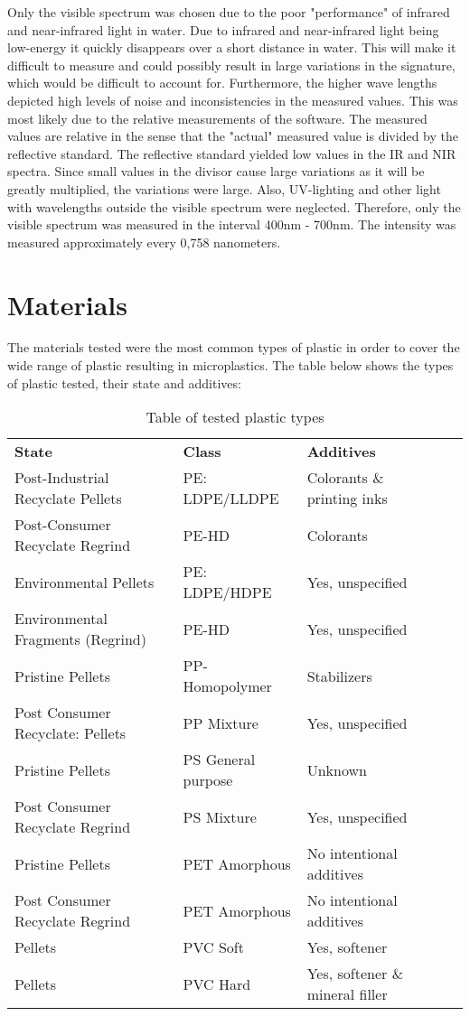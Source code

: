 Only the visible spectrum was chosen due to the poor "performance" of infrared and near-infrared light in water. Due to infrared and near-infrared light being low-energy it quickly disappears over a short distance in water. This will make it difficult to measure and could possibly result in large variations in the signature, which would be difficult to account for. Furthermore, the higher wave lengths depicted high levels of noise and inconsistencies in the measured values. This was most likely due to the relative measurements of the software. The measured values are relative in the sense that the "actual" measured value is divided by the reflective standard. The reflective standard yielded low values in the IR and NIR spectra. Since small values in the divisor cause large variations as it will be greatly multiplied, the variations were large. Also, UV-lighting and other light with wavelengths outside the visible spectrum were neglected. Therefore, only the visible spectrum was measured in the interval 400nm - 700nm. The intensity was measured approximately every 0,758 nanometers. 

\section{Materials}
The materials tested were the most common types of plastic in order to cover the wide range of plastic resulting in microplastics. The table below shows the types of plastic tested, their state and additives:

\begin{center}
\begin{table}[H]
\begin{tabular}{ |l|l|l|l|l| } 
 \hline
 \textbf{State} & \textbf{Class} & \textbf{Additives}\\ 
Post-Industrial Recyclate Pellets & PE: LDPE/LLDPE & Colorants \& printing inks\\
Post-Consumer Recyclate Regrind & PE-HD & Colorants\\
Environmental Pellets & PE: LDPE/HDPE & Yes, unspecified\\
Environmental Fragments (Regrind) & PE-HD & Yes, unspecified\\
Pristine Pellets & PP-Homopolymer & Stabilizers\\
Post Consumer Recyclate: Pellets & PP Mixture & Yes, unspecified\\
Pristine Pellets & PS General purpose & Unknown\\
Post Consumer Recyclate Regrind & PS Mixture & Yes, unspecified\\ 
Pristine Pellets & PET Amorphous & No intentional additives\\
Post Consumer Recyclate Regrind & PET Amorphous & No intentional additives\\
Pellets & PVC Soft & Yes, softener\\
Pellets & PVC Hard & Yes, softener \& mineral filler\\
 \hline
\end{tabular}
\caption{Table of tested plastic types} \label{tab:tested:plastic}
\end{table}
\end{center}

